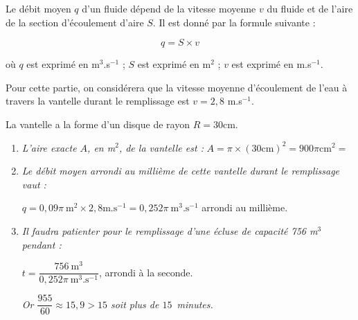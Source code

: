 
\medskip 

Le débit moyen $q$ d'un fluide dépend de la vitesse moyenne $v$ du fluide et de l'aire de la section d'écoulement d'aire $S$. Il est donné par la formule suivante : 

\[q = S \times v\]
 
où $q$ est exprimé en m$^3$.s$^{-1}$ ; $S$ est exprimé en m$^2$ ; $v$ est exprimé en m.s$^{-1}$. 

Pour cette partie, on considérera que la vitesse moyenne d'écoulement de l'eau à travers la vantelle durant le remplissage est $v = 2,8$ m.s$^{-1}$.
 
La vantelle a la forme d'un disque de rayon $R = 30$cm. 

\medskip

\begin{enumerate}
\item \textit{L'aire exacte $A$, en m$^2$, de la vantelle est :} $A=\pi\times(30\text{cm})^2=900\pi\text{cm}^2=$
\item \textit{Le débit moyen arrondi au millième de cette vantelle durant le 
remplissage vaut :} 

$q=0,09\pi~\text{m}^2\times 2,8\text{m.s}^{-1}=0,252\pi~\text{m}^3\text{.s}^{-1}$ arrondi au millième.

\item \textit{Il faudra patienter pour le remplissage d'une écluse de capacité 756 m$^3$ pendant :}

$t=\dfrac{756~\text{m}^3}{0,252\pi~\text{m}^3\text{.s}^{-1}}$, arrondi à la seconde.

\textit{Or $\dfrac{955}{60}\approx 15,9> 15$ soit plus de $15$~minutes.}
\end{enumerate}
	 
\vspace{0.5cm}

